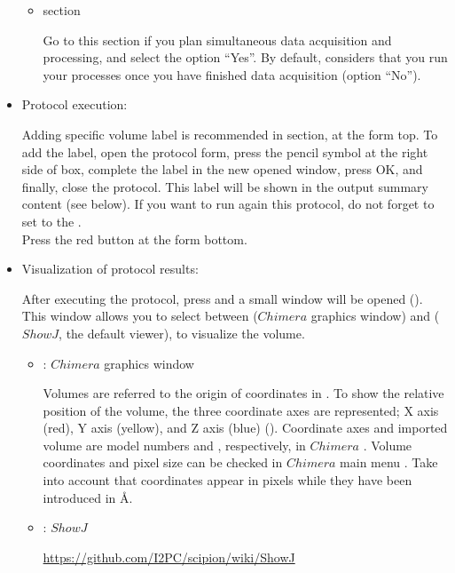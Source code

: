 \begin{itemize}
\begin{itemize}
  \item {} section
  
  Go to this section if you plan simultaneous data acquisition and processing, and select the option ``Yes''. By default, \scipion considers that you run your processes once you have finished data acquisition (option ``No'').
  
  \end{itemize}
  \item Protocol execution:
  
  Adding specific volume label is recommended in  section, at the form top. To add the label, open the protocol form, press the pencil symbol at the right side of  box, complete the label in the new opened window, press OK, and finally, close the protocol. This label will be shown in the output summary content (see below). If you want to run again this protocol, do not forget to set to  the .\\
  Press the  red button at the form bottom.
  
  \item Visualization of protocol results:
  
  After executing the protocol, press  and a small window will be opened (). This window allows you to select between  ($Chimera$ graphics window) and  ($ShowJ$, the default \scipion viewer), to visualize the volume.
   
   \begin{itemize}
   \item {}: $Chimera$ graphics window
   
   Volumes are referred to the origin of coordinates in \chimera. To show the relative position of the volume, the three coordinate axes are represented; X axis (red), Y axis (yellow), and Z axis (blue) (). Coordinate axes and imported volume are model numbers  and , respectively, in $Chimera$ . Volume coordinates and pixel size can be checked in $Chimera$ main menu . Take into account that coordinates appear in pixels while they have been introduced in \AA.
   
  \item {}: $ShowJ$
   
\url{https://github.com/I2PC/scipion/wiki/ShowJ}



\end{itemize}
\end{itemize}
